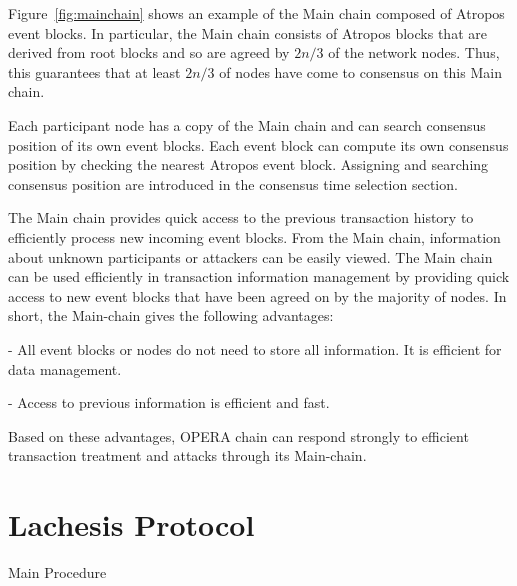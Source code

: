 \documentclass{article}
\makeatletter
\def\BState{\State\hskip-\ALG@thistlm}
\makeatother
\begin{document}
Figure~\ref{fig:mainchain} shows an example of the Main chain composed of Atropos event blocks. 
In particular, the Main chain consists of Atropos blocks that are derived from root blocks and so are agreed by $2n/3$ of the network nodes. Thus, this guarantees that at least $2n/3$ of nodes have come to consensus on this Main chain. 

Each participant node has a copy of the Main chain and can search consensus position of its own event blocks.
Each event block can compute its own consensus position by checking the nearest Atropos event block. Assigning and searching consensus position are introduced in the consensus time selection section. 

The Main chain provides quick access to the previous transaction history to efficiently process new incoming event blocks. From the Main chain, information about unknown participants or attackers can be easily viewed.
The Main chain can be used efficiently in transaction information management by providing quick access to new event blocks that have been agreed on by the majority of nodes. In short, the Main-chain gives the following advantages:

-	All event blocks or nodes do not need to store all information. It is efficient for data management.

-	Access to previous information is efficient and fast.

Based on these advantages, OPERA chain can respond strongly to efficient transaction treatment and attacks through its Main-chain.

\newpage
\section{Lachesis Protocol}\label{se:lca}

\begin{algorithm}[H]
\caption{Main Procedure}\label{al:main}
\end{algorithm}
\end{document}
